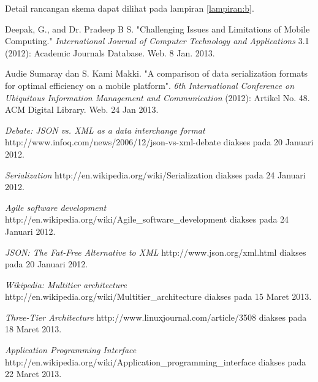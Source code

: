 \documentclass[a4paper, 12pt, oneside]{report}
\begin{document}
Detail rancangan skema dapat dilihat pada lampiran \ref{lampiran:b}.

\begin{thebibliography}{99}
\singlespacing 


Deepak, G., and Dr. Pradeep B S. "Challenging Issues and Limitations of Mobile Computing."
  \emph{International Journal of Computer Technology and Applications} 3.1 (2012): Academic Journals Database. Web. 8 Jan. 2013.
  
Audie Sumaray dan S. Kami Makki. "A comparison of data serialization formats for optimal efficiency on a mobile platform". \emph{6th International Conference on Ubiquitous Information Management and Communication} (2012): Artikel No. 48. ACM Digital Library. Web. 24 Jan 2013.
  
  \emph{Debate: JSON vs. XML as a data interchange format}
  http://www.infoq.com/news/2006/12/json-vs-xml-debate
  diakses pada 20 Januari 2012.
  
  \emph{Serialization}
  http://en.wikipedia.org/wiki/Serialization
  diakses pada 24 Januari 2012.
  
  \emph{Agile software development}
  http://en.wikipedia.org/wiki/Agile\_software\_development
  diakses pada 24 Januari 2012.
  
  \emph{JSON: The Fat-Free Alternative to XML}
  http://www.json.org/xml.html
  diakses pada 20 Januari 2012.
  
  \emph{Wikipedia: Multitier architecture}
  http://en.wikipedia.org/wiki/Multitier\_architecture
  diakses pada 15 Maret 2013.
  
  \emph{Three-Tier Architecture}
  http://www.linuxjournal.com/article/3508
  diakses pada 18 Maret 2013.
  
  \emph{Application Programming Interface}
  http://en.wikipedia.org/wiki/Application\_programming\_interface
  diakses pada 22 Maret 2013.
  

\end{thebibliography}
\end{document}
